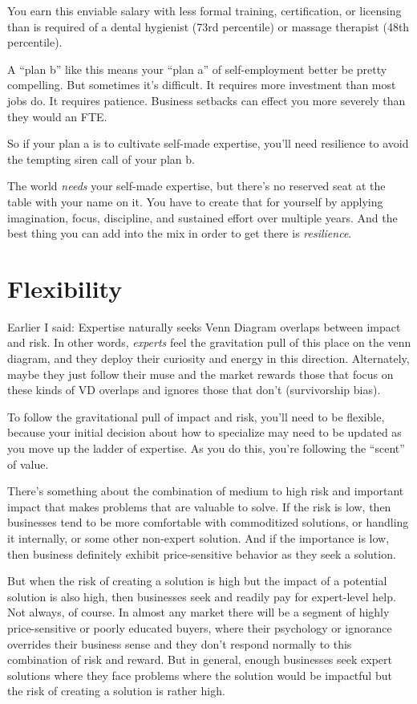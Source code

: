 You earn this enviable salary with less formal training, certification, or licensing than is required of a dental hygienist (73rd percentile) or massage therapist (48th percentile).

A ``plan b'' like this means your ``plan a'' of self-employment better be pretty compelling. But sometimes it's difficult. It requires more investment than most jobs do. It requires patience. Business setbacks can effect you more severely than they would an FTE.

So if your plan a is to cultivate self-made expertise, you'll need resilience to avoid the tempting siren call of your plan b.

The world \emph{needs} your self-made expertise, but there's no reserved seat at the table with your name on it. You have to create that for yourself by applying imagination, focus, discipline, and sustained effort over multiple years. And the best thing you can add into the mix in order to get there is \emph{resilience}.

\section{Flexibility}

Earlier I said: Expertise naturally seeks Venn Diagram overlaps between impact and risk. In other words, \emph{experts} feel the gravitation pull of this place on the venn diagram, and they deploy their curiosity and energy in this direction. Alternately, maybe they just follow their muse and the market rewards those that focus on these kinds of VD overlaps and ignores those that don't (survivorship bias).

To follow the gravitational pull of impact and risk, you'll need to be flexible, because your initial decision about how to specialize may need to be updated as you move up the ladder of expertise. As you do this, you're following the ``scent'' of value.

There's something about the combination of medium to high risk and important impact that makes problems that are valuable to solve. If the risk is low, then businesses tend to be more comfortable with commoditized solutions, or handling it internally, or some other non-expert solution. And if the importance is low, then business definitely exhibit price-sensitive behavior as they seek a solution.

But when the risk of creating a solution is high but the impact of a potential solution is also high, then businesses seek and readily pay for expert-level help. Not always, of course. In almost any market there will be a segment of highly price-sensitive or poorly educated buyers, where their psychology or ignorance overrides their business sense and they don't respond normally to this combination of risk and reward. But in general, enough businesses seek expert solutions where they face problems where the solution would be impactful but the risk of creating a solution is rather high.

